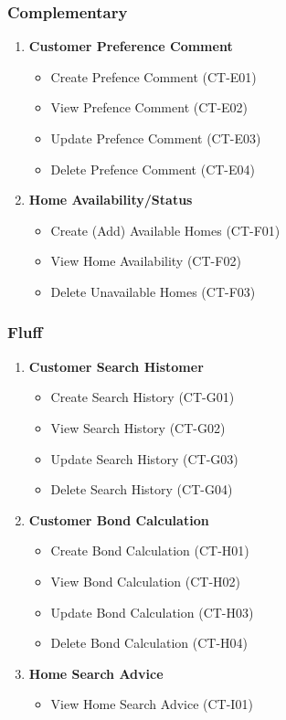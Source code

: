 \documentclass[11pt]{article}
\begin{document}
			\subsubsection{Complementary}
				\begin{enumerate}[i]
					\item \textbf{Customer Preference Comment}
					\begin{itemize}
						\item Create Prefence Comment (CT-E01)
						\item View Prefence Comment (CT-E02)
						\item Update Prefence Comment (CT-E03)
						\item Delete Prefence Comment (CT-E04)
					\end{itemize}
					
					\item \textbf{Home Availability/Status}
					\begin{itemize}
						\item Create (Add) Available Homes (CT-F01)
						\item View Home Availability (CT-F02)
						\item Delete Unavailable Homes (CT-F03)
					\end{itemize}
				\end{enumerate}
		
			\subsubsection{Fluff}
				\begin{enumerate}[i]
					\item \textbf{Customer Search Histomer}
					\begin{itemize}
						\item Create Search History (CT-G01)
						\item View Search History (CT-G02)
						\item Update Search History (CT-G03)
						\item Delete Search History (CT-G04)
					\end{itemize}
					
					\item \textbf{Customer Bond Calculation}
					\begin{itemize}
						\item Create Bond Calculation (CT-H01)
						\item View Bond Calculation (CT-H02)
						\item Update Bond Calculation (CT-H03)
						\item Delete Bond Calculation (CT-H04)
					\end{itemize}
					
					\item \textbf{Home Search Advice}
					\begin{itemize}
						\item View Home Search Advice (CT-I01)
					\end{itemize}
				\end{enumerate}
		
\end{document}
